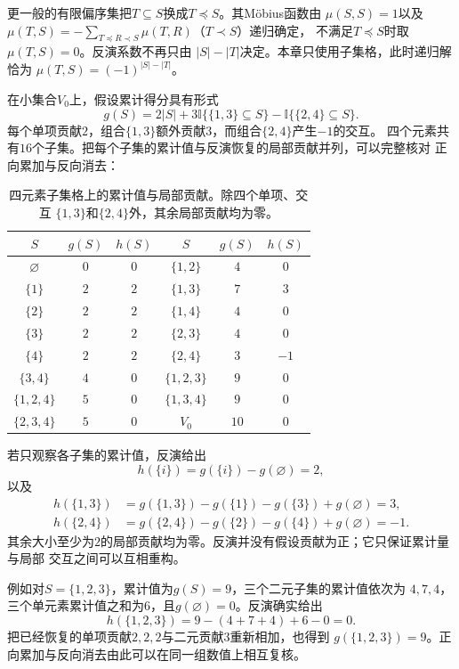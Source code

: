 更一般的有限偏序集把$T\subseteq S$换成$T\preceq S$。其Möbius函数由
$\mu(S,S)=1$以及
$\mu(T,S)=-\sum_{T\preceq R\prec S}\mu(T,R)$（$T\prec S$）递归确定，
不满足$T\preceq S$时取$\mu(T,S)=0$。反演系数不再只由
$|S|-|T|$决定。本章只使用子集格，此时递归解恰为
$\mu(T,S)=(-1)^{|S|-|T|}$。

在小集合$V_0$上，假设累计得分具有形式
\[
  g(S)
  =
  2|S|
  +3\mathbb{I}\{\{1,3\}\subseteq S\}
  -\mathbb{I}\{\{2,4\}\subseteq S\}.
\]
每个单项贡献$2$，组合$\{1,3\}$额外贡献$3$，而组合$\{2,4\}$产生$-1$的交互。
四个元素共有$16$个子集。把每个子集的累计值与反演恢复的局部贡献并列，可以完整核对
正向累加与反向消去：
\begin{table}[htbp]
  \centering
  \begin{tabular}{ccc@{\qquad}ccc}
    \toprule
    $S$ & $g(S)$ & $h(S)$ & $S$ & $g(S)$ & $h(S)$ \\
    \midrule
    $\varnothing$ & $0$ & $0$ & $\{1,2\}$ & $4$ & $0$ \\
    $\{1\}$ & $2$ & $2$ & $\{1,3\}$ & $7$ & $3$ \\
    $\{2\}$ & $2$ & $2$ & $\{1,4\}$ & $4$ & $0$ \\
    $\{3\}$ & $2$ & $2$ & $\{2,3\}$ & $4$ & $0$ \\
    $\{4\}$ & $2$ & $2$ & $\{2,4\}$ & $3$ & $-1$ \\
    $\{3,4\}$ & $4$ & $0$ & $\{1,2,3\}$ & $9$ & $0$ \\
    $\{1,2,4\}$ & $5$ & $0$ & $\{1,3,4\}$ & $9$ & $0$ \\
    $\{2,3,4\}$ & $5$ & $0$ & $V_0$ & $10$ & $0$ \\
    \bottomrule
  \end{tabular}
  \caption{四元素子集格上的累计值与局部贡献。除四个单项、交互
  $\{1,3\}$和$\{2,4\}$外，其余局部贡献均为零。}
  \label{tab:comb-four-element-mobius}
\end{table}
若只观察各子集的累计值，反演给出
\[
  h(\{i\})=g(\{i\})-g(\varnothing)=2,
\]
以及
\[
  \begin{aligned}
  h(\{1,3\})
  &=g(\{1,3\})-g(\{1\})-g(\{3\})+g(\varnothing)=3,\\
  h(\{2,4\})
  &=g(\{2,4\})-g(\{2\})-g(\{4\})+g(\varnothing)=-1.
  \end{aligned}
\]
其余大小至少为$2$的局部贡献均为零。反演并没有假设贡献为正；它只保证累计量与局部
交互之间可以互相重构。

例如对$S=\{1,2,3\}$，累计值为$g(S)=9$，三个二元子集的累计值依次为
$4,7,4$，三个单元素累计值之和为$6$，且$g(\varnothing)=0$。反演确实给出
\[
  h(\{1,2,3\})=9-(4+7+4)+6-0=0.
\]
把已经恢复的单项贡献$2,2,2$与二元贡献$3$重新相加，也得到
$g(\{1,2,3\})=9$。正向累加与反向消去由此可以在同一组数值上相互复核。

